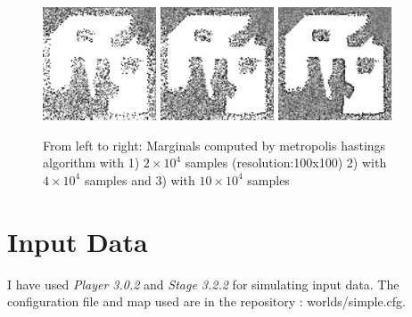 \documentclass[10pt,oneside,letterpaper]{article}
\begin{document}
\begin{figure}
  \includegraphics[width=0.3\textwidth]{figures/Metropolis_Marginals_20k_iter.png}
  \includegraphics[width=0.3\textwidth]{figures/Metropolis_Marginals_40k_iter.png}
  \includegraphics[width=0.3\textwidth]{figures/metropolis_100x100.png}
  \caption{From left to right: Marginals computed by metropolis hastings algorithm with 1) $2 \times 10^4$ samples (resolution:100x100) 2) with $4 \times 10^4$ samples and 3) with $10 \times 10^4$ samples }
  \label{fig:metropolis-results}
\end{figure}

\section{Input Data}
I have used \emph{Player 3.0.2} and \emph{Stage 3.2.2} \cite{gerkey2003player} for simulating input data. The configuration file and map used are in the repository : worlds/simple.cfg.
\end{document}
